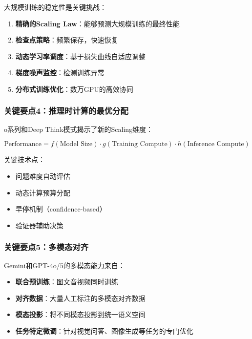 \documentclass[12pt,a4paper]{article}
\begin{document}
大规模训练的稳定性是关键挑战：

\begin{enumerate}
    \item \textbf{精确的Scaling Law}：能够预测大规模训练的最终性能
    \item \textbf{检查点策略}：频繁保存，快速恢复
    \item \textbf{动态学习率调度}：基于损失曲线自适应调整
    \item \textbf{梯度噪声监控}：检测训练异常
    \item \textbf{分布式训练优化}：数万GPU的高效协同
\end{enumerate}

\subsubsection{关键要点4：推理时计算的最优分配}

o系列和Deep Think模式揭示了新的Scaling维度：

\begin{equation}
\text{Performance} = f(\text{Model Size}) \cdot g(\text{Training Compute}) \cdot h(\text{Inference Compute})
\end{equation}

关键技术点：
\begin{itemize}
    \item 问题难度自动评估
    \item 动态计算预算分配
    \item 早停机制（confidence-based）
    \item 验证器辅助决策
\end{itemize}

\subsubsection{关键要点5：多模态对齐}

Gemini和GPT-4o/5的多模态能力来自：

\begin{itemize}
    \item \textbf{联合预训练}：图文音视频同时训练
    \item \textbf{对齐数据}：大量人工标注的多模态对齐数据
    \item \textbf{模态投影}：将不同模态投影到统一语义空间
    \item \textbf{任务特定微调}：针对视觉问答、图像生成等任务的专门优化
\end{itemize}
\end{document}
